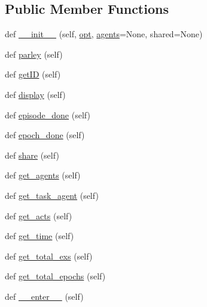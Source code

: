 \subsection*{Public Member Functions}
\begin{DoxyCompactItemize}
\item 
def \hyperlink{classparlai_1_1core_1_1worlds_1_1World_a8824b02453596976aab9389d2cae2a2f}{\+\_\+\+\_\+init\+\_\+\+\_\+} (self, \hyperlink{classparlai_1_1core_1_1worlds_1_1World_a3640d92718acd3e6942a28c1ab3678bd}{opt}, \hyperlink{classparlai_1_1core_1_1worlds_1_1World_a728f75194cc26ea4035047c46cf62608}{agents}=None, shared=None)
\item 
def \hyperlink{classparlai_1_1core_1_1worlds_1_1World_ac7e23e08adad68116e72162cd419786b}{parley} (self)
\item 
def \hyperlink{classparlai_1_1core_1_1worlds_1_1World_a5ef8bd0bc50edb86ef87e4a3e72b6192}{get\+ID} (self)
\item 
def \hyperlink{classparlai_1_1core_1_1worlds_1_1World_a147371097765449933ca963215eba603}{display} (self)
\item 
def \hyperlink{classparlai_1_1core_1_1worlds_1_1World_aaaef76f5bae4cdbe8f78241f8cd7c3a3}{episode\+\_\+done} (self)
\item 
def \hyperlink{classparlai_1_1core_1_1worlds_1_1World_aa8a3ab5345bbfa1d485dec974ed28b53}{epoch\+\_\+done} (self)
\item 
def \hyperlink{classparlai_1_1core_1_1worlds_1_1World_a08d9212397f136cbc52ee224bcb0bc4e}{share} (self)
\item 
def \hyperlink{classparlai_1_1core_1_1worlds_1_1World_a1c74e607d064c5823e56b23b21ce17f0}{get\+\_\+agents} (self)
\item 
def \hyperlink{classparlai_1_1core_1_1worlds_1_1World_a25ccd7740aa992bb7055bf6549574a07}{get\+\_\+task\+\_\+agent} (self)
\item 
def \hyperlink{classparlai_1_1core_1_1worlds_1_1World_aa1d3c0cc946f5ade27373f7dc0bd77b5}{get\+\_\+acts} (self)
\item 
def \hyperlink{classparlai_1_1core_1_1worlds_1_1World_a621ed405ee96d67bc4bab781145a3daa}{get\+\_\+time} (self)
\item 
def \hyperlink{classparlai_1_1core_1_1worlds_1_1World_a0f9926a92069bfb833a6c4a531d99b70}{get\+\_\+total\+\_\+exs} (self)
\item 
def \hyperlink{classparlai_1_1core_1_1worlds_1_1World_acf90b0f1a9ec1314b905159559b4d4ab}{get\+\_\+total\+\_\+epochs} (self)
\item 
def \hyperlink{classparlai_1_1core_1_1worlds_1_1World_a714433529a05cc3862ad3b8ade4628f7}{\+\_\+\+\_\+enter\+\_\+\+\_\+} (self)

\end{DoxyCompactItemize}

